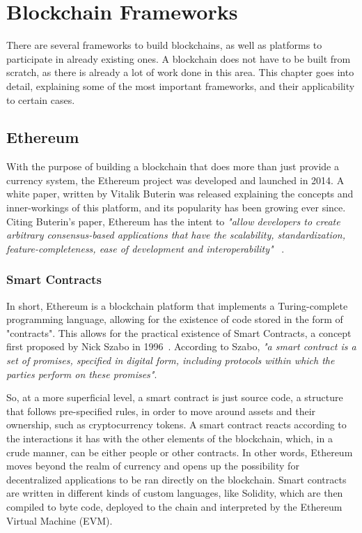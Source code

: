 \section{Blockchain Frameworks}
\label{sec:blockchain-frameworks}

\minitoc \mtcskip \noindent

There are several frameworks to build blockchains, as well as platforms to participate in already existing ones. A blockchain does not have to be built from scratch, as there is already a lot of work done in this area. This chapter goes into detail, explaining some of the most important frameworks, and their applicability to certain cases.

\subsection{Ethereum}

With the purpose of building a blockchain that does more than just provide a currency system, the Ethereum project was developed and launched in 2014. A white paper, written by Vitalik Buterin was released explaining the concepts and inner-workings of this platform, and its popularity has been growing ever since. Citing Buterin's paper, Ethereum has the intent to \textit{"allow developers to create arbitrary consensus-based applications that have the
scalability, standardization, feature-completeness, ease of development and interoperability" }~\cite{Buterin2014}.

\subsubsection{Smart Contracts}
In short, Ethereum is a blockchain platform that implements a Turing-complete programming language, allowing for the existence of code stored in the form of "contracts". This allows for the practical existence of Smart Contracts, a concept first proposed by Nick Szabo in 1996~\cite{szabo1996smart}. According to Szabo, \textit{"a smart contract is a set of promises, specified in digital form, including protocols within which the parties perform on these promises"}. 

So, at a more superficial level, a smart contract is just source code, a structure that follows pre-specified rules, in order to move around assets and their ownership, such as cryptocurrency tokens. A smart contract reacts according to the interactions it has with the other elements of the blockchain, which, in a crude manner, can be either people or other contracts. In other words, Ethereum moves beyond the realm of currency and opens up the possibility for decentralized applications to be ran directly on the blockchain. Smart contracts are written in different kinds of custom languages, like Solidity, which are then compiled to byte code, deployed to the chain and interpreted by the Ethereum Virtual Machine (EVM).

